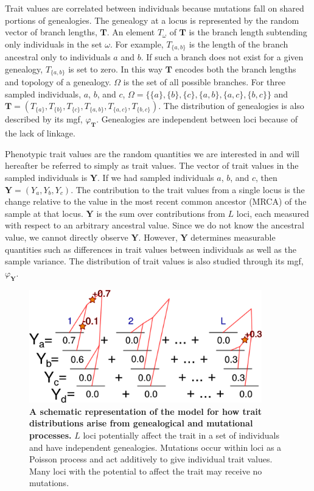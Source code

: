 Trait values are correlated between individuals because mutations fall on shared
portions of genealogies. The genealogy at a locus is represented by the random
vector of branch lengths, $\mathbf{T}$. An element $T_{\omega}$ of $\mathbf{T}$
is the branch length subtending only individuals in the set $\omega$. For
example, $T_{\{a,b\}}$ is the length of the branch ancestral only to individuals
$a$ and $b$. If such a branch does not exist for a given genealogy,
$T_{\{a,b\}}$ is set to zero. In this way $\mathbf{T}$ encodes both the branch
lengths and topology of a genealogy. $\Omega$ is the set of all possible
branches. For three sampled individuals, $a$, $b$, and $c$,
$\Omega=\{\{a\},\{b\},\{c\},\{a,b\},\{a,c\},\{b,c\}\}$ and
$\mathbf{T}=(T_{\{a\}},T_{\{b\}},T_{\{c\}},T_{\{a,b\}},T_{\{a,c\}},T_{\{b,c\}})$.
The distribution of genealogies is also described by its mgf,
$\varphi_{\mathbf{T}}$. Genealogies are independent between loci because of the
lack of linkage.

Phenotypic trait values are the random quantities we are interested in and will
hereafter be referred to simply as trait values. The vector of trait values in
the sampled individuals is $\mathbf{Y}$. If we had sampled individuals $a$, $b$,
and $c$, then $\mathbf{Y}=(Y_a,Y_b,Y_c)$. The contribution to the trait values
from a single locus is the change relative to the value in the most recent
common ancestor (MRCA) of the sample at that locus. $\mathbf{Y}$ is the sum over
contributions from $L$ loci, each measured with respect to an arbitrary
ancestral value. Since we do not know the ancestral value, we cannot directly
observe $\mathbf{Y}$. However, $\mathbf{Y}$ determines measurable quantities
such as differences in trait values between individuals as well as the sample
variance. The distribution of trait values is also studied through its mgf,
$\varphi_{\mathbf{Y}}$.

\begin{figure}
  \centering
  \includegraphics[width=0.9\textwidth]{./figures/schema.png}

  \caption{\textbf{A schematic representation of the model for how trait
  distributions arise from genealogical and mutational processes.} $L$ loci
  potentially affect the trait in a set of individuals and have independent
  genealogies. Mutations occur within loci as a Poisson process and act
  additively to give individual trait values. Many loci with the potential to
  affect the trait may receive no mutations.}

  \label{fig:schema}
\end{figure}

